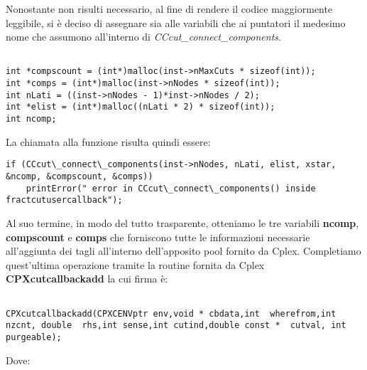 \documentclass[11pt]{article}
\begin{document}
Nonostante non risulti necessario, al fine di rendere il codice maggiormente leggibile, si è deciso di assegnare sia alle variabili che ai puntatori il medesimo nome che assumono all’interno di \textit{CCcut\_connect\_components}.

\begin{lstlisting}

int *compscount = (int*)malloc(inst->nMaxCuts * sizeof(int));
int *comps = (int*)malloc(inst->nNodes * sizeof(int));
int nLati = ((inst->nNodes - 1)*inst->nNodes / 2);
int *elist = (int*)malloc((nLati * 2) * sizeof(int));
int ncomp; 

\end{lstlisting}

La chiamata alla funzione risulta quindi essere:

\begin{lstlisting}
if (CCcut\_connect\_components(inst->nNodes, nLati, elist, xstar, &ncomp, &compscount, &comps))
    printError(" error in CCcut\_connect\_components() inside fractcutusercallback");
\end{lstlisting}

Al suo termine, in modo del tutto trasparente, otteniamo le tre variabili \textbf{ncomp}, \textbf{compscount} e \textbf{comps} che forniscono tutte le informazioni necessarie all'aggiunta dei tagli all'interno dell'apposito pool fornito da Cplex.
Completiamo quest'ultima operazione tramite la routine fornita da Cplex \textbf{CPXcutcallbackadd} la cui firma è:

\begin{lstlisting}

CPXcutcallbackadd(CPXCENVptr env,void * cbdata,int  wherefrom,int  nzcnt, double  rhs,int sense,int cutind,double const *  cutval, int purgeable);

\end{lstlisting}

Dove:
\end{document}
